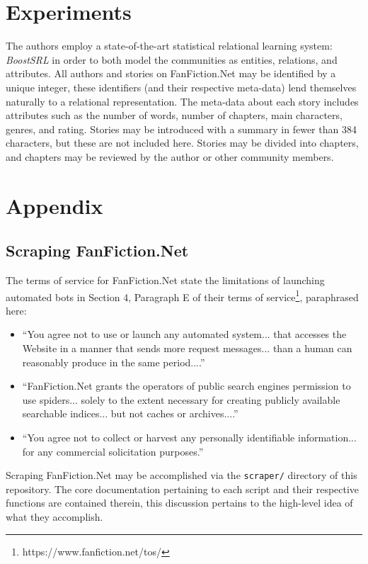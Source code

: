 \documentclass[letterpaper]{article}
\begin{document}
\section{Experiments}

The authors employ a state-of-the-art statistical relational learning system: \textit{BoostSRL} in order to both model the communities as entities, relations, and attributes. All authors and stories on FanFiction.Net may be identified by a unique integer, these identifiers (and their respective meta-data) lend themselves naturally to a relational representation. The meta-data about each story includes attributes such as the number of words, number of chapters, main characters, genres, and rating. Stories may be introduced with a summary in fewer than 384 characters, but these are not included here. Stories may be divided into chapters, and chapters may be reviewed by the author or other community members.



\section{Appendix}

\subsection{Scraping FanFiction.Net}

The terms of service for FanFiction.Net state the limitations of launching automated bots in Section 4, Paragraph E of their terms of service\footnote{https://www.fanfiction.net/tos/}, paraphrased here:

\begin{itemize}
    \item ``You agree not to use or launch any automated system... that accesses the Website in a manner that sends more request messages... than a human can reasonably produce in the same period....''
    \item ``FanFiction.Net grants the operators of public search engines permission to use spiders... solely to the extent necessary for creating publicly available searchable indices... but not caches or archives....''
    \item ``You agree not to collect or harvest any personally identifiable information... for any commercial solicitation purposes.''
\end{itemize}

Scraping FanFiction.Net may be accomplished via the \texttt{scraper/} directory of this repository. The core documentation pertaining to each script and their respective functions are contained therein, this discussion pertains to the high-level idea of what they accomplish.
\end{document}
